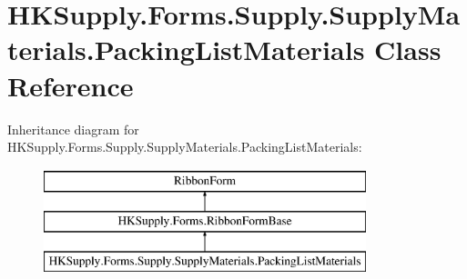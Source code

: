 \hypertarget{class_h_k_supply_1_1_forms_1_1_supply_1_1_supply_materials_1_1_packing_list_materials}{}\section{H\+K\+Supply.\+Forms.\+Supply.\+Supply\+Materials.\+Packing\+List\+Materials Class Reference}
\label{class_h_k_supply_1_1_forms_1_1_supply_1_1_supply_materials_1_1_packing_list_materials}
Inheritance diagram for H\+K\+Supply.\+Forms.\+Supply.\+Supply\+Materials.\+Packing\+List\+Materials\+:\begin{figure}[H]
\begin{center}
\leavevmode
\includegraphics[height=3.000000cm]{class_h_k_supply_1_1_forms_1_1_supply_1_1_supply_materials_1_1_packing_list_materials}
\end{center}
\end{figure}
